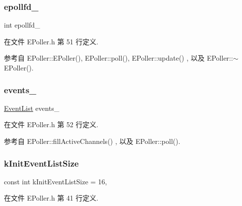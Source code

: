 \subsubsection{\texorpdfstring{epollfd\+\_\+}{epollfd\_}}
{\footnotesize\ttfamily int epollfd\+\_\+\hspace{0.3cm}{\ttfamily [private]}}



在文件 E\+Poller.\+h 第 51 行定义.



参考自 E\+Poller\+::\+E\+Poller(), E\+Poller\+::poll(), E\+Poller\+::update() , 以及 E\+Poller\+::$\sim$\+E\+Poller().

\mbox{\label{classmuduo_1_1EPoller_a230adbff354741cf0b5d4af33c4fb2e3}} 
\subsubsection{\texorpdfstring{events\+\_\+}{events\_}}
{\footnotesize\ttfamily \hyperlink{classmuduo_1_1EPoller_ac074005c5f2127640fb6a6e22aa58bae}{Event\+List} events\+\_\+\hspace{0.3cm}{\ttfamily [private]}}



在文件 E\+Poller.\+h 第 52 行定义.



参考自 E\+Poller\+::fill\+Active\+Channels() , 以及 E\+Poller\+::poll().

\mbox{\label{classmuduo_1_1EPoller_a926125e406052891f69477342de6275f}} 
\subsubsection{\texorpdfstring{k\+Init\+Event\+List\+Size}{kInitEventListSize}}
{\footnotesize\ttfamily const int k\+Init\+Event\+List\+Size = 16\hspace{0.3cm}{\ttfamily [static]}, {\ttfamily [private]}}



在文件 E\+Poller.\+h 第 41 行定义.

